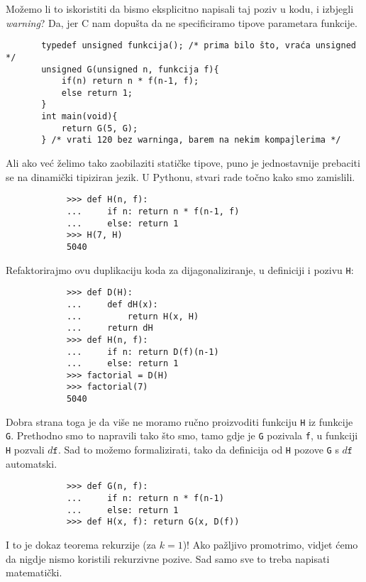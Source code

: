 Možemo li to iskoristiti da bismo eksplicitno napisali taj poziv u kodu, i izbjegli \emph{warning}? Da, jer C nam dopušta da ne specificiramo tipove parametara funkcije.

\begin{verbatim}
       typedef unsigned funkcija(); /* prima bilo što, vraća unsigned */
       unsigned G(unsigned n, funkcija f){
           if(n) return n * f(n-1, f);
           else return 1;
       }
       int main(void){
           return G(5, G);
       } /* vrati 120 bez warninga, barem na nekim kompajlerima */
\end{verbatim}

Ali ako već želimo tako zaobilaziti statičke tipove, puno je jednostavnije prebaciti se na dinamički tipiziran jezik. U Pythonu, stvari rade točno kako smo zamislili.

\begin{verbatim}
            >>> def H(n, f):
            ...     if n: return n * f(n-1, f)
            ...     else: return 1
            >>> H(7, H)
            5040
\end{verbatim}

Refaktorirajmo ovu duplikaciju koda za dijagonaliziranje, u definiciji i pozivu \texttt H:

\begin{verbatim}
            >>> def D(H):
            ...     def dH(x):
            ...         return H(x, H)
            ...     return dH
            >>> def H(n, f):
            ...     if n: return D(f)(n-1)
            ...     else: return 1
            >>> factorial = D(H)
            >>> factorial(7)
            5040
\end{verbatim}
Dobra strana toga je da više ne moramo ručno proizvoditi funkciju \texttt H iz funkcije \texttt G. Prethodno smo to napravili tako što smo, tamo gdje je \texttt G pozivala \texttt f, u funkciji \texttt H pozvali $d\texttt f$. Sad to možemo formalizirati, tako da definicija od \texttt H pozove \texttt G s $d\texttt f$ automatski.
\begin{verbatim}
            >>> def G(n, f):
            ...     if n: return n * f(n-1)
            ...     else: return 1
            >>> def H(x, f): return G(x, D(f))
\end{verbatim}

I to je dokaz teorema rekurzije (za $k=1$)! Ako pažljivo promotrimo, vidjet ćemo da nigdje nismo koristili rekurzivne pozive. Sad samo sve to treba napisati matematički.

